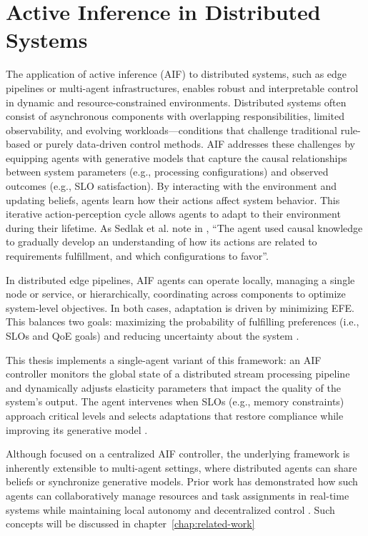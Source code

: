 \section{Active Inference in Distributed Systems}
The application of active inference (AIF) to distributed systems, such as edge pipelines or multi-agent infrastructures, enables robust and interpretable control in dynamic and resource-constrained environments. Distributed systems often consist of asynchronous components with overlapping responsibilities, limited observability, and evolving workloads—conditions that challenge traditional rule-based or purely data-driven control methods. AIF addresses these challenges by equipping agents with generative models that capture the causal relationships between system parameters (e.g., processing configurations) and observed outcomes (e.g., SLO satisfaction). By interacting with the environment and updating beliefs, agents learn how their actions affect system behavior. This iterative action-perception cycle allows agents to adapt to their environment during their lifetime. As Sedlak et al. note in \cite{sedlak_active_2024}, “The agent used causal knowledge to gradually develop an understanding of how its actions are related to requirements fulfillment, and which configurations to favor”.

In distributed edge pipelines, AIF agents can operate locally, managing a single node or service, or hierarchically, coordinating across components to optimize system-level objectives. In both cases, adaptation is driven by minimizing EFE. This balances two goals: maximizing the probability of fulfilling preferences (i.e., SLOs and QoE goals) and reducing uncertainty about the system \cite{friston_free-energy_2010, lanillos_active_2021}. 

This thesis implements a single-agent variant of this framework: an AIF controller monitors the global state of a distributed stream processing pipeline and dynamically adjusts elasticity parameters that impact the quality of the system's output. The agent intervenes when SLOs (e.g., memory constraints) approach critical levels and selects adaptations that restore compliance while improving its generative model \cite{sedlak_equilibrium_2024}.

Although focused on a centralized AIF controller, the underlying framework is inherently extensible to multi-agent settings, where distributed agents can share beliefs or synchronize generative models. Prior work has demonstrated how such agents can collaboratively manage resources and task assignments in real-time systems while maintaining local autonomy and decentralized control \cite{sedlak_slo-aware_2025}. Such concepts will be discussed in chapter~\ref{chap:related-work}
